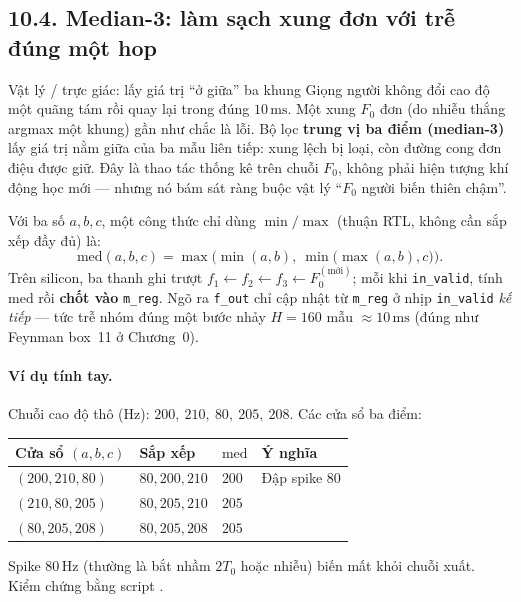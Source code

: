 \subsection*{10.4. Median-3: làm sạch xung đơn với trễ đúng một hop}

\begin{firstprin}{Vật lý / trực giác: lấy giá trị ``ở giữa'' ba khung}
Giọng người không đổi cao độ một quãng tám rồi quay lại trong đúng $10\,\text{ms}$. Một xung $F_0$ đơn (do nhiễu thắng argmax một khung) gần như chắc là lỗi. Bộ lọc \textbf{trung vị ba điểm (median-3)} lấy giá trị nằm giữa của ba mẫu liên tiếp: xung lệch bị loại, còn đường cong đơn điệu được giữ. Đây là thao tác thống kê trên chuỗi $F_0$, không phải hiện tượng khí động học mới --- nhưng nó bám sát ràng buộc vật lý ``$F_0$ người biến thiên chậm''.
\end{firstprin}

Với ba số $a,b,c$, một công thức chỉ dùng $\min/\max$ (thuận RTL, không cần sắp xếp đầy đủ) là:
\begin{equation}
\label{eq:ch10_med3}
\mathrm{med}(a,b,c)=\max\bigl(\min(a,b),\ \min\bigl(\max(a,b),c\bigr)\bigr).
\end{equation}
Trên silicon, ba thanh ghi trượt $f_1\leftarrow f_2\leftarrow f_3\leftarrow F_0^{\mathrm{(mới)}}$; mỗi khi \texttt{in\_valid}, tính $\mathrm{med}$ rồi \textbf{chốt vào} \texttt{m\_reg}. Ngõ ra \texttt{f\_out} chỉ cập nhật từ \texttt{m\_reg} ở nhịp \texttt{in\_valid} \emph{kế tiếp} --- tức trễ nhóm đúng một bước nhảy $H=160$ mẫu $\approx 10\,\text{ms}$ (đúng như Feynman box~11 ở Chương~0).

\paragraph{Ví dụ tính tay.} Chuỗi cao độ thô (Hz): $200,\ 210,\ 80,\ 205,\ 208$. Các cửa sổ ba điểm:
\begin{center}\small
\begin{tabular}{@{}llll@{}}\toprule
Cửa sổ $(a,b,c)$ & Sắp xếp & $\mathrm{med}$ & Ý nghĩa \\
\midrule
$(200,210,80)$ & $80,200,210$ & $200$ & Đập spike $80$ \\
$(210,80,205)$ & $80,205,210$ & $205$ & \\
$(80,205,208)$ & $80,205,208$ & $205$ & \\
\bottomrule
\end{tabular}
\end{center}
Spike $80\,\text{Hz}$ (thường là bắt nhầm $2T_0$ hoặc nhiễu) biến mất khỏi chuỗi xuất. Kiểm chứng bằng script .

